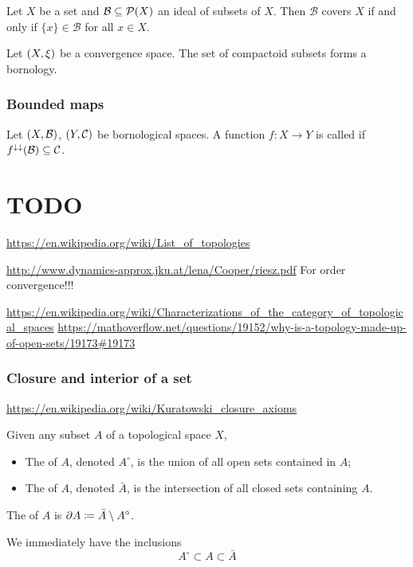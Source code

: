 \begin{lemma}
Let $X$ be a set and $\mathcal{B}\subseteq \operatorname{\mathcal{P}}(X)$ an ideal of subsets of $X$. Then $\mathcal{B}$ covers $X$ \textup{if and only if} $\{x\}\in \mathcal{B}$ for all $x\in X$.
\end{lemma}

\begin{example}
Let $\left( X,\xi \right)$ be a convergence space. The set of compactoid subsets forms a bornology.
\end{example}



\subsection{Bounded maps}
\begin{definition}
Let $\left( X, \mathcal{B} \right)$, $\left( Y,\mathcal{C} \right)$ be bornological spaces. A function $f: X\to Y$ is called  if $f^{\downarrow\downarrow}(\mathcal{B}) \subseteq \mathcal{C}$.
\end{definition}






\chapter{TODO}

\url{https://en.wikipedia.org/wiki/List_of_topologies}

\url{http://www.dynamics-approx.jku.at/lena/Cooper/riesz.pdf} For order convergence!!!


\url{https://en.wikipedia.org/wiki/Characterizations_of_the_category_of_topological_spaces} 
\url{https://mathoverflow.net/questions/19152/why-is-a-topology-made-up-of-open-sets/19173#19173}




\subsection{Closure and interior of a set}
\url{https://en.wikipedia.org/wiki/Kuratowski_closure_axioms}

\begin{definition}
Given any subset $A$ of a topological space $X$,
\begin{itemize}
\item The  of $A$, denoted $A^\circ$, is the union of all open sets contained in $A$;
\item The  of $A$, denoted $\bar{A}$, is the intersection of all closed sets containing $A$. 
\end{itemize}
The  of $A$ is $\partial A \coloneqq \bar{A}\setminus A^{\circ}$.
\end{definition}
We immediately have the inclusions
\[ A^\circ \subset A \subset \bar{A} \]

